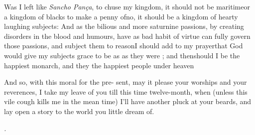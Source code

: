\documentclass[twoside]{article}
\begin{document}
Was I left like \textit{Sancho Pança}, to\break
chuse my kingdom, it should not be\break
maritime\tsk or a kingdom of blacks to make a penny of\tsh no, it should\break
be a kingdom of hearty laughing subjects: And as the bilious and more
sa\-turnine passions, by creating disorders\break
in the blood and humours, have as bad\break
{}
habit of virtue can fully govern those passions, and subject them to
reason\tsh I should add to my prayer\tsk that God would give
my subjects grace to be as  as they were
; and then\break should I be the happiest monarch,
and they the happiest people under heaven\tsk{}

And so, with this moral for the pre-\break
sent, may it please your worships and\break
your reverences, I take my leave of you\break
till this time twelve-month, when (unless\break
this vile cough kills me in the mean\break
time) I’ll have another pluck at your\break
beards, and lay open a story to the\break
world you little dream of.

\vskip 72pt
\centerline{\itshape{}.}
\end{document}
